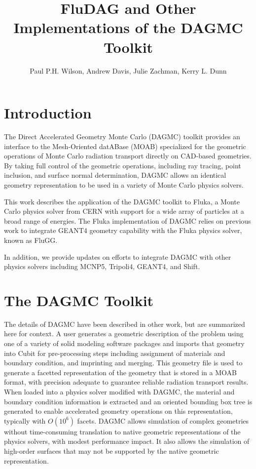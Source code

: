 \documentclass{anstrans}[12pt]
\title{FluDAG and Other Implementations of the DAGMC Toolkit}
\author{Paul P.H. Wilson, Andrew Davis, Julie Zachman, Kerry L. Dunn}
\institute{University of Wisconsin-Madison, 1500 Engineering Dr,
  Madison, WI 53706}
\begin{document}
\section{Introduction}

The Direct Accelerated Geometry Monte Carlo (DAGMC)\cite{dagmc} toolkit provides
an interface to the Mesh-Oriented datABase (MOAB)\cite{MOAB} specialized for the
geometric operations of Monte Carlo radiation transport directly on
CAD-based geometries.  By taking full control of the geometric
operations, including ray tracing, point inclusion, and surface
normal determination, DAGMC allows an identical geometry representation to be
used in a variety of Monte Carlo physics solvers.

This work describes the application of the DAGMC toolkit to
Fluka\cite{fluka}, a Monte Carlo physics solver from CERN with support
for a wide array of particles at a broad range of energies.  The Fluka
implementation of DAGMC relies on previous work to integrate
GEANT4\cite{GEANT4} geometry capability with the Fluka physics solver,
known as FluGG\cite{flugg}.

In addition, we provide updates on efforts to integrate DAGMC with
other physics solvers including MCNP5\cite{mcnp5},
Tripoli4\cite{tripoli}, GEANT4, and Shift\cite{shift}.

\section{The DAGMC Toolkit}

The details of DAGMC have been described in other work\cite{dagmc}, but are
summarized here for context.  A user generates a geometric description
of the problem using one of a variety of solid modeling software
packages and imports that geometry into Cubit\cite{cubit} for
pre-processing steps including assignment of materials and boundary
condition, and imprinting and merging.  This geometry file is used to
generate a facetted representation of the geometry that is stored in a
MOAB format, with precision adequate to guarantee reliable radiation
transport results\cite{snouffer_ans}.  When loaded into a physics solver
modified with DAGMC, the material and boundary condition information
is extracted and an oriented bounding box tree is generated to enable
accelerated geometry operations on this representation, typically with $O(10^6)$
facets.  DAGMC allows simulation of complex geometries without
time-consuming translation to native geometric representations of the
physics solvers, with modest performance impact.  It also allows the
simulation of high-order surfaces that may not be supported by the
native geometric representation.
\end{document}

